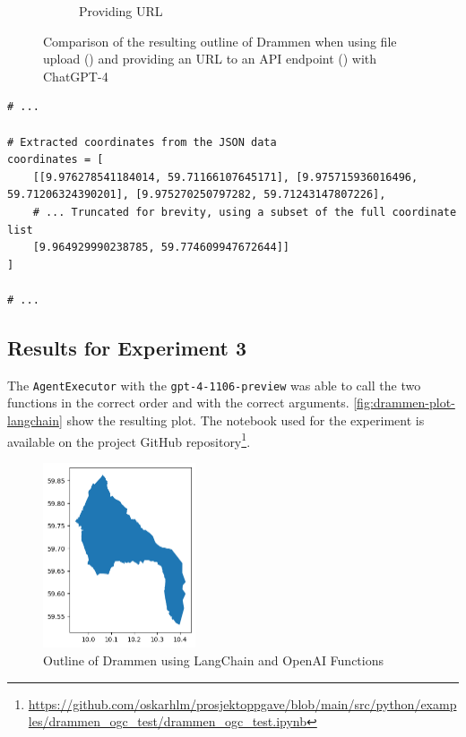 \begin{figure}
\begin{subfigure}{0.45\textwidth}
        \caption{Providing URL}
        \label{subfig:drammen-outline-api}
    \end{subfigure}
    \caption{Comparison of the resulting outline of Drammen when using file upload () and providing an URL to an API endpoint () with ChatGPT-4}
    \label{fig:file-upload-api-comparison}
\end{figure}

\begin{minipage}{\linewidth}
    \begin{lstlisting}[style=python, caption=ChatGPT code that truncates coordinates, label=lst:python-for-failed-drammen-outline]
# ...

# Extracted coordinates from the JSON data
coordinates = [
    [[9.976278541184014, 59.71166107645171], [9.975715936016496, 59.71206324390201], [9.975270250797282, 59.71243147807226], 
    # ... Truncated for brevity, using a subset of the full coordinate list
    [9.964929990238785, 59.774609947672644]]
]

# ...
\end{lstlisting}
\end{minipage}

\subsection{Results for Experiment 3}\label{subsec:experiment-3-results}

The \texttt{AgentExecutor} with the \texttt{gpt-4-1106-preview} was able to call the two functions in the correct order and with the correct arguments. \autoref{fig:drammen-plot-langchain} show the resulting plot. The notebook used for the experiment is available on the project GitHub repository\footnote{\url{https://github.com/oskarhlm/prosjektoppgave/blob/main/src/python/examples/drammen_ogc_test/drammen_ogc_test.ipynb}}.

\begin{figure}
    \centering
    \includegraphics[width=0.4\textwidth]{../figs/drammen_plot_langchain.png}
    \caption{Outline of Drammen using LangChain and OpenAI Functions}
    \label{fig:drammen-plot-langchain}
\end{figure}

\glsresetall

